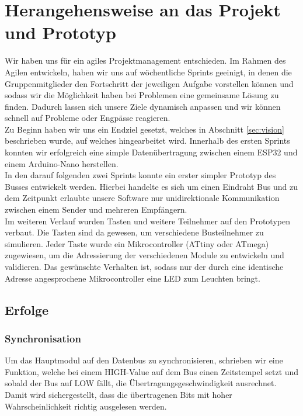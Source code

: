 \section{Herangehensweise an das Projekt und Prototyp}
Wir haben uns für ein agiles Projektmanagement entschieden. Im Rahmen des Agilen entwickeln, haben wir uns auf wöchentliche Sprints geeinigt, in denen die Gruppenmitglieder den Fortschritt der jeweiligen Aufgabe vorstellen können und sodass wir die Möglichkeit haben bei Problemen eine gemeinsame Lösung zu finden. Dadurch lassen sich unsere Ziele dynamisch anpassen und wir können schnell auf Probleme oder Engpässe reagieren.\\

\noindent Zu Beginn haben wir uns ein Endziel gesetzt, welches in Abschnitt \ref{sec:vision} beschrieben wurde, auf welches hingearbeitet wird. Innerhalb des ersten Sprints konnten wir erfolgreich eine simple Datenübertragung zwischen einem ESP32 und einem Arduino-Nano herstellen.\\

\noindent In den darauf folgenden zwei Sprints konnte ein erster simpler Prototyp des Busses entwickelt werden. Hierbei handelte es sich um einen Eindraht Bus und zu dem Zeitpunkt erlaubte unsere Software nur unidirektionale Kommunikation zwischen einem Sender und mehreren Empfängern.\\

\noindent Im weiteren Verlauf wurden Tasten und weitere Teilnehmer auf den Prototypen verbaut. Die Tasten sind da gewesen, um verschiedene Busteilnehmer zu simulieren. Jeder Taste wurde ein Mikrocontroller (ATtiny oder ATmega) zugewiesen, um die Adressierung der verschiedenen Module zu entwickeln und validieren. Das gewünschte Verhalten ist, sodass nur der durch eine identische Adresse angesprochene Mikrocontroller eine LED zum Leuchten bringt.

\subsection{Erfolge}
\subsubsection{Synchronisation}
Um das Hauptmodul auf den Datenbus zu synchronisieren, schrieben wir eine Funktion, welche bei einem HIGH-Value auf dem Bus einen Zeitstempel setzt und sobald der Bus auf LOW fällt, die Übertragungsgeschwindigkeit ausrechnet. Damit wird sichergestellt, dass die übertragenen Bits mit hoher Wahrscheinlichkeit richtig ausgelesen werden.

